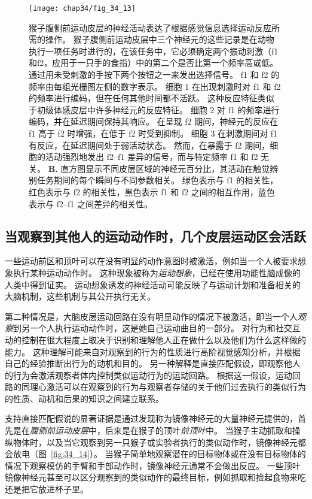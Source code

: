 \begin{figure}[htbp]
	\centering
	\texttt{[image: chap34/fig\_34\_13]}
	\caption{猴子腹侧前运动皮层的神经活动表达了根据感觉信息选择运动反应所需的操作\cite{romo2004neuronal}。
		猴子腹侧前运动皮层中三个神经元的这些记录是在动物执行一项任务时进行的，在该任务中，它必须确定两个振动刺激（f1和f2，应用于一只手的食指）中的第二个是否比第一个频率高或低。
		通过用未受刺激的手按下两个按钮之一来发出选择信号。
		f1 和 f2 的频率由每组光栅图左侧的数字表示。
		细胞 1 在出现刺激时对 f1 和 f2 的频率进行编码，但在任何其他时间都不活跃。
		这种反应特征类似于初级体感皮层中许多神经元的反应特征。
		细胞 2 对 f1 的频率进行编码，并在延迟期间保持其响应。
		在呈现 f2 期间，神经元的反应在 f1 高于 f2 时增强，在低于 f2 时受到抑制。
		细胞 3 在刺激期间对 f1 有反应，在延迟期间处于弱活动状态。
		然而，在暴露于 f2 期间，细胞的活动强烈地发出 f2–f1 差异的信号，而与特定频率 f1 和 f2 无关。
		\textbf{B.} 直方图显示不同皮层区域的神经元百分比，其活动在触觉辨别任务期间的每个瞬间与不同参数相关。
		绿色表示与 f1 的相关性，红色表示与 f2 的相关性，黑色表示 f1 和 f2 之间的相互作用，蓝色表示与 f2–f1 之间差异的相关性。}
	\label{fig:34_13}
\end{figure}



\subsection{当观察到其他人的运动动作时，几个皮层运动区会活跃}

一些运动前区和顶叶可以在没有明显的动作意图时被激活，例如当一个人被要求想象执行某种运动动作时。
这种现象被称为\textit{运动想象}，已经在使用功能性脑成像的人类中得到证实。
运动想象诱发的神经活动可能反映了与运动计划和准备相关的大脑机制，这些机制与其公开执行无关。


第二种情况是，大脑皮层运动回路在没有明显动作的情况下被激活，即当一个人\textit{观察}到另一个人执行运动动作时，这是她自己运动曲目的一部分。
对行为和社交互动的控制在很大程度上取决于识别和理解他人正在做什么以及他们为什么这样做的能力。
这种理解可能来自对观察到的行为的性质进行高阶视觉感知分析，并根据自己的经验推断出行为的动机和目的。
另一种解释是直接匹配假设，即观察他人的行为会激活观察者体内控制类似运动行为的运动回路。
根据这一假设，运动回路的同理心激活可以在观察到的行为与观察者存储的关于他们过去执行的类似行为的性质、动机和后果的知识之间建立联系。


支持直接匹配假说的显著证据是通过发现称为镜像神经元的大量神经元提供的，首先是在\textit{腹侧前运动皮层}中，后来是在猴子的顶叶\textit{前顶叶}中。
当猴子主动抓取和操纵物体时，以及当它观察到另一只猴子或实验者执行的类似动作时，镜像神经元都会放电（图~\ref{fig:34_14}）。
当猴子简单地观察潜在的目标物体或在没有目标物体的情况下观察模仿的手臂和手部动作时，镜像神经元通常不会做出反应。
一些顶叶镜像神经元甚至可以区分观察到的类似动作的最终目标，例如抓取和捡起食物来吃还是把它放进杯子里。


